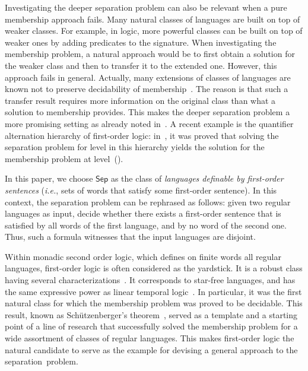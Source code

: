 \documentclass{CSML}
\newcommand\Sep{\ensuremath{\mathsf{Sep}}\xspace}
\theoremstyle{plain}
\begin{document}
Investigating the deeper separation problem can also be relevant when a pure
membership approach fails. Many natural classes of languages are built on top
of weaker classes. For example, in logic, more powerful classes can be built
on top of weaker ones by adding predicates to the signature. When
investigating the membership problem, a natural approach would be to first
obtain a solution for the weaker class and then to transfer it to the extended
one. However, this approach fails in general. Actually, many extensions of
classes of languages are known not to preserve decidability of
membership~\cite{ABR:Undec-Identity:92,Rhodes99-undec,DBLP:journals/ijac/Auinger10}.
The reason is that such a transfer result requires more information on the original
class than what a solution to membership provides. This makes the deeper
separation problem a more promising setting as already noted
in~\cite{AZ97-J,Steinberg:delay2001}. A recent example is the quantifier
alternation hierarchy of first-order logic: in~\cite{PZ:icalp14}, it was
proved that solving the separation problem for level  in this hierarchy
yields the solution for the membership problem at level~().

\smallskip{} In this paper, we choose
\Sep as the class of \emph{languages definable by first-order
  sentences} (\emph{i.e.}, sets of words that satisfy some first-order
sentence).  In this context, the separation problem can be rephrased
as follows: given two regular languages as input, decide whether there
exists a first-order sentence that is satisfied by all words of the
first language, and by no word of the second one. Thus, such a
formula witnesses that the input languages are disjoint.

Within monadic second order logic, which defines on finite words
all regular languages, first-order logic is often considered as the
yardstick.  It is a robust class having several
characterizations~\cite{Diekert&Gastin:First-order-definable-languages:2008:a}. It
corresponds to star-free languages, and has the same expressive power
as linear temporal logic~\cite{kltl}.  In particular, it was the first
natural class for which the membership problem was proved to be
decidable.  This result, known as Schützenberger's
theorem~\cite{sfo,mnpfo}, served as a template and a starting point of
a line of research that successfully solved the membership problem for
a wide assortment of classes of regular languages. This makes
first-order logic the natural candidate to serve as the example for
devising a general approach to the separation~problem.
\end{document}
